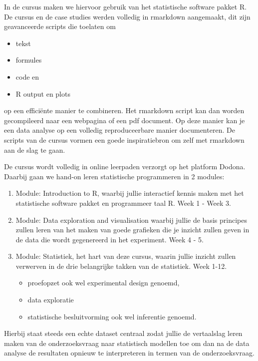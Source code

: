 \documentclass[
  12pt,dutch,coursenotes]{book}
\providecommand{\tightlist}{%
  \setlength{\itemsep}{0pt}\setlength{\parskip}{0pt}}
\theoremstyle{definition}
\theoremstyle{definition}
\theoremstyle{definition}
\theoremstyle{remark}
\begin{document}
In de cursus maken we hiervoor gebruik van
het statistische software pakket R. De cursus en de case studies werden volledig in rmarkdown aangemaakt, dit zijn geavanceerde scripts die toelaten om

\begin{itemize}
\tightlist
\item
  tekst
\item
  formules
\item
  code en
\item
  R output en plots
\end{itemize}

op een efficiënte manier te combineren. Het rmarkdown script kan dan worden gecompileerd naar een webpagina of een pdf document. Op deze manier kan je een data analyse op een volledig reproduceerbare manier documenteren. De scripts van de cursus vormen een goede inspiratiebron om zelf met rmarkdown aan de slag te gaan.

De cursus wordt volledig in online leerpaden verzorgt op het platform Dodona.
Daarbij gaan we hand-on leren statistische programmeren in 2 modules:

\begin{enumerate}
\def\labelenumi{\arabic{enumi}.}
\item
  Module: Introduction to R, waarbij jullie interactief kennis maken met het statistische software pakket en programmeer taal R. Week 1 - Week 3.
\item
  Module: Data exploration and visualisation waarbij jullie de basis principes zullen leren van het maken van goede grafieken die je inzicht zullen geven in de data die wordt gegenereerd in het experiment. Week 4 - 5.
\item
  Module: Statistiek, het hart van deze cursus, waarin jullie inzicht zullen verwerven in de drie belangrijke takken van de statistiek. Week 1-12.

  \begin{itemize}
  \tightlist
  \item
    proefopzet ook wel experimental design genoemd,
  \item
    data exploratie
  \item
    statistische besluitvorming ook wel inferentie genoemd.
  \end{itemize}
\end{enumerate}

Hierbij staat steeds een echte dataset centraal zodat jullie de vertaalslag leren maken van de onderzoeksvraag naar statistisch modellen toe om dan na de data analyse de resultaten opnieuw te interpreteren in termen van de onderzoeksvraag.
\end{document}

